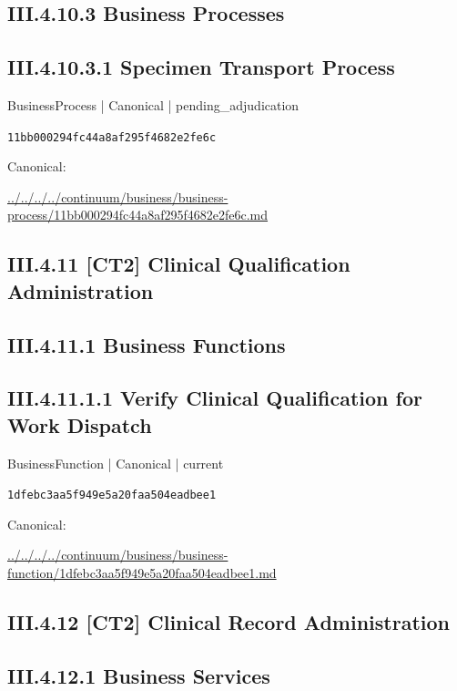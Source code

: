 \documentclass[10pt,a4paper]{article}
\begin{document}
\subsection*{III.4.10.3 Business Processes}
\subsection*{III.4.10.3.1 Specimen Transport Process}
{\small BusinessProcess | Canonical | pending\_adjudication}\par
\texttt{11bb000294fc44a8af295f4682e2fe6c}\par
Canonical: \par
{\footnotesize\url{../../../../continuum/business/business-process/11bb000294fc44a8af295f4682e2fe6c.md}}\par
\subsection*{III.4.11 [CT2] Clinical Qualification Administration}
\subsection*{III.4.11.1 Business Functions}
\subsection*{III.4.11.1.1 Verify Clinical Qualification for Work Dispatch}
{\small BusinessFunction | Canonical | current}\par
\texttt{1dfebc3aa5f949e5a20faa504eadbee1}\par
Canonical: \par
{\footnotesize\url{../../../../continuum/business/business-function/1dfebc3aa5f949e5a20faa504eadbee1.md}}\par
\subsection*{III.4.12 [CT2] Clinical Record Administration}
\subsection*{III.4.12.1 Business Services}
\end{document}
